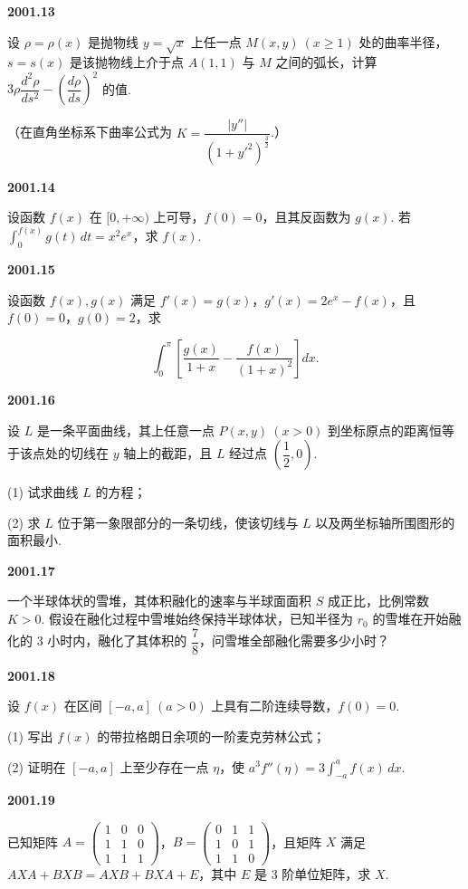 \documentclass[UTF8,12pt,fontset=windows]{ctexart}
\begin{document}
\vfill
\newpage
{\large\bfseries 2001.13}

设 $\rho = \rho(x)$ 是抛物线 $y = \sqrt{x}$ 上任一点 $M(x,y) \ (x \geqslant 1)$ 处的曲率半径，$s = s(x)$ 是该抛物线上介于点 $A(1,1)$ 与 $M$ 之间的弧长，计算 $3\rho\dfrac{d^2\rho}{ds^2} - \left(\dfrac{d\rho}{ds}\right)^2$ 的值.

（在直角坐标系下曲率公式为 $K = \dfrac{|y''|}{(1 + y'^2)^{\frac{3}{2}}}$.）

\vfill
\newpage
{\large\bfseries 2001.14}

设函数 $f(x)$ 在 $[0, +\infty)$ 上可导，$f(0) = 0$，且其反函数为 $g(x)$. 若 $\int_0^{f(x)} g(t) \, dt = x^2 e^x$，求 $f(x)$.

\vfill
\newpage
{\large\bfseries 2001.15}

设函数 $f(x), g(x)$ 满足 $f'(x) = g(x)$，$g'(x) = 2e^x - f(x)$，且 $f(0) = 0$，$g(0) = 2$，求

$$\int_0^\pi \left[\frac{g(x)}{1 + x} - \frac{f(x)}{(1 + x)^2}\right] dx.$$

\vfill
\newpage
{\large\bfseries 2001.16}

设 $L$ 是一条平面曲线，其上任意一点 $P(x,y) \ (x > 0)$ 到坐标原点的距离恒等于该点处的切线在 $y$ 轴上的截距，且 $L$ 经过点 $\left(\dfrac{1}{2}, 0\right)$.

(1) 试求曲线 $L$ 的方程；

(2) 求 $L$ 位于第一象限部分的一条切线，使该切线与 $L$ 以及两坐标轴所围图形的面积最小.

\vfill
\newpage
{\large\bfseries 2001.17}

一个半球体状的雪堆，其体积融化的速率与半球面面积 $S$ 成正比，比例常数 $K > 0$. 假设在融化过程中雪堆始终保持半球体状，已知半径为 $r_0$ 的雪堆在开始融化的 3 小时内，融化了其体积的 $\dfrac{7}{8}$，问雪堆全部融化需要多少小时？

\vfill
\newpage
{\large\bfseries 2001.18}

设 $f(x)$ 在区间 $[-a, a] \ (a > 0)$ 上具有二阶连续导数，$f(0) = 0$.

(1) 写出 $f(x)$ 的带拉格朗日余项的一阶麦克劳林公式；

(2) 证明在 $[-a, a]$ 上至少存在一点 $\eta$，使 $a^3 f''(\eta) = 3\int_{-a}^{a} f(x) \, dx$.

\vfill
\newpage
{\large\bfseries 2001.19}

已知矩阵 $A = \begin{pmatrix} 1 & 0 & 0 \\ 1 & 1 & 0 \\ 1 & 1 & 1 \end{pmatrix}$，$B = \begin{pmatrix} 0 & 1 & 1 \\ 1 & 0 & 1 \\ 1 & 1 & 0 \end{pmatrix}$，且矩阵 $X$ 满足 $AXA + BXB = AXB + BXA + E$，其中 $E$ 是 3 阶单位矩阵，求 $X$.
\end{document}
